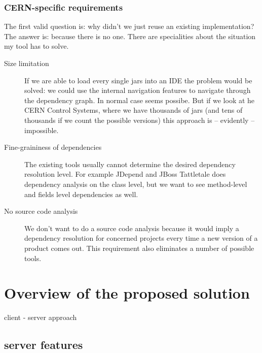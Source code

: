 \subsubsection{CERN-specific requirements}


The first valid question is: why didn't we just reuse an existing
implementation? The answer is: because there is no one.
There are specialities about the situation my tool has to solve.
\begin{description}
\item[Size limitation] If we are able to load every single jars into an IDE the
problem would be solved: we could use the internal navigation features to navigate 
through the dependency graph. In normal case seems possibe. 
But if we look at he CERN Control Systems, where we have thousands of jars (and tens of 
thousands if we count the possible versions) this approach is -- evidently -- impossible.   
\item[Fine-graininess of dependencies] The existing tools usually cannot determine
the desired dependency resolution level. For example JDepend \cite{JDepend} and
JBoss Tattletale \cite{Tattletale} does dependency analysis on the class level,
but we want to see method-level and fields level dependencies as well.
\item[No source code analysis] We don't want to do a source code analysis because 
it would imply a dependency resolution for concerned projects every time a new version 
of a product comes out. This requirement also eliminates a number of possible tools. 
\end{description}



\section{Overview of the proposed solution}

client - server approach

\subsection{server features}


